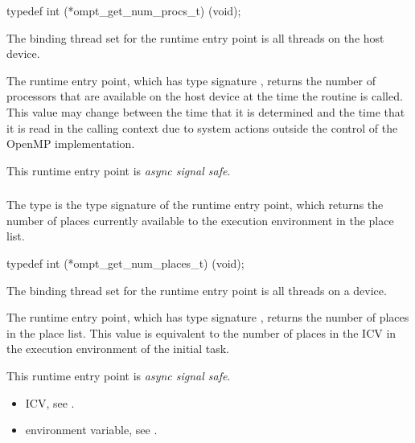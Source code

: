 \format
\begin{ccppspecific}
\begin{omptInquiry}
typedef int (*ompt_get_num_procs_t) (void);
\end{omptInquiry}
\end{ccppspecific}

\binding
The binding thread set for the  runtime entry 
point is all threads on the host device.

\descr
The  runtime entry point, which has type 
signature  , returns the number of processors 
that are available on the host device at the time the routine is called. 
This value may change between the time that it is determined and the 
time that it is read in the calling context due to system actions 
outside the control of the OpenMP implementation.

This runtime entry point is \emph{async signal safe}.



\subsubsection{}
\label{sec:ompt_get_num_places_t}
\label{sec:ompt_get_num_places}

\summary
The  type is the type signature of the 
 runtime entry point, which returns the
number of places currently available to the execution environment 
in the place list.

\format
\begin{ccppspecific}
\begin{omptInquiry}
typedef int (*ompt_get_num_places_t) (void);
\end{omptInquiry}
\end{ccppspecific}

\binding
The binding thread set for the  runtime entry 
point is all threads on a device.

\descr
The  runtime entry point, which has type signature 
, returns the number of places in the place list. 
This value is equivalent to the number of places in the  
ICV in the execution environment of the initial task.

This runtime entry point is \emph{async signal safe}.

\crossreferences
\begin{itemize}
\item {} ICV, see
.

\item {} environment variable, see
.
\end{itemize}




